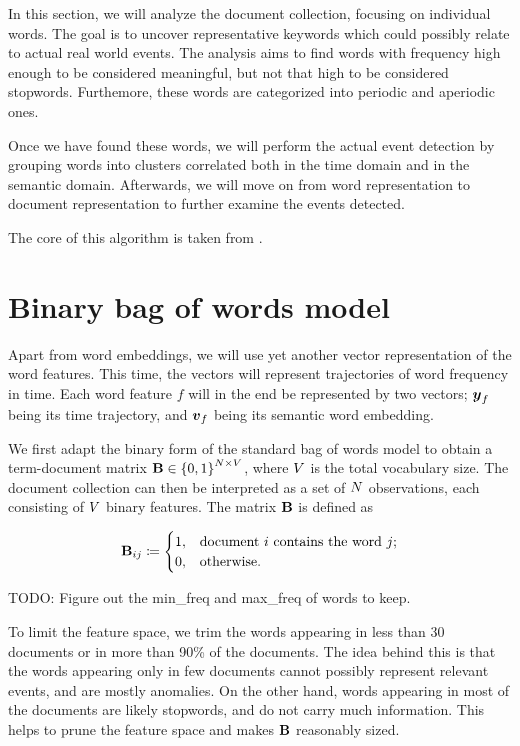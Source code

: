In this section, we will analyze the document collection, focusing on individual words. The goal is to uncover representative keywords which could possibly relate to actual real world events. The analysis aims to find words with frequency high enough to be considered meaningful, but not that high to be considered stopwords. Furthemore, these words are categorized into periodic and aperiodic ones.

Once we have found these words, we will perform the actual event detection by grouping words into clusters correlated both in the time domain and in the semantic domain. Afterwards, we will move on from word representation to document representation to further examine the events detected.

The core of this algorithm is taken from \cite{event-detection}.


\section{Binary bag of words model}
Apart from word embeddings, we will use yet another vector representation of the word features. This time, the vectors will represent trajectories of word frequency in time. Each word feature $f$ will in the end be represented by two vectors; $\vect{\traj}_{f}$ being its time trajectory, and $\embed_{f}$ being its semantic word embedding.

We first adapt the binary form of the standard bag of words model to obtain a term-document matrix $\mathbf{B} \in \left\{ 0, 1 \right\}^{N \times V}$, where $V$ is the total vocabulary size. The document collection can then be interpreted as a set of $N$ observations, each consisting of $V$ binary features. The matrix $\mathbf{B}$ is defined as

\begin{equation} \label{eq:bow-matrix}
	\mathbf{B}_{ij} \coloneqq
	\begin{cases}
		1, & \text{document}~i~\text{contains the word}~j \text{;} \\
		0, & \text{otherwise.}
	\end{cases}
\end{equation}

{\color{red} TODO: Figure out the min\_freq and max\_freq of words to keep.}

To limit the feature space, we trim the words appearing in less than 30 documents or in more than 90\% of the documents. The idea behind this is that the words appearing only in few documents cannot possibly represent relevant events, and are mostly anomalies. On the other hand, words appearing in most of the documents are likely stopwords, and do not carry much information. This helps to prune the feature space and makes $\mathbf{B}$ reasonably sized.


